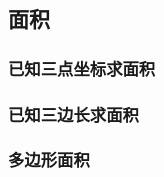 \subsection{面积}
    \subsubsection{已知三点坐标求面积}
    \subsubsection{已知三边长求面积}
    \subsubsection{多边形面积}
